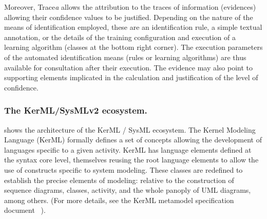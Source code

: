 Moreover, Trace\textit{a} allows the attribution to the traces of information (evidences) allowing their confidence values to be justified. Depending on the nature of the means of identification employed, these are an identification rule, a simple textual annotation, or the details of the training configuration and execution of a learning algorithm (classes at the bottom right corner). The execution parameters of the automated identification means (rules or learning algorithms) are thus available for consultation after their execution. The evidence may also point to supporting elements implicated in the calculation and justification of the level of confidence.






\subsubsection{The KerML/SysMLv2 ecosystem.}
 shows the architecture of the KerML / SysML ecosystem. The Kernel Modeling Language (KerML) formally defines a set of concepts allowing the development of languages specific to a given activity. 
KerML has language elements defined at the syntax core level, themselves reusing the root language elements to allow the use of constructs specific to system modeling. These classes are redefined to establish the precise elements of modeling: relative to the construction of sequence diagrams, classes, activity, and the whole panoply of UML diagrams, among others. (For more details, see the KerML metamodel specification document ~\cite{kerML}).

